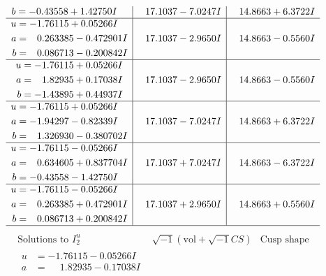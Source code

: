 \documentclass[1p]{elsarticle_modified}
\theoremstyle{definition}
\newcommand{\I}{\sqrt{-1}}
\begin{document}
$$\begin{array}{c|c|c}
\begin{aligned}
b &= -0.43558 + 1.42750 I\end{aligned}
 & \phantom{-}17.1037 - 7.0247 I & \phantom{-}14.8663 + 6.3722 I \\ \hline\begin{aligned}
u &= -1.76115 + 0.05266 I \\
a &= \phantom{-}0.263385 - 0.472901 I \\
b &= \phantom{-}0.086713 - 0.200842 I\end{aligned}
 & \phantom{-}17.1037 - 2.9650 I & \phantom{-}14.8663 - 0.5560 I \\ \hline\begin{aligned}
u &= -1.76115 + 0.05266 I \\
a &= \phantom{-}1.82935 + 0.17038 I \\
b &= -1.43895 + 0.44937 I\end{aligned}
 & \phantom{-}17.1037 - 2.9650 I & \phantom{-}14.8663 - 0.5560 I \\ \hline\begin{aligned}
u &= -1.76115 + 0.05266 I \\
a &= -1.94297 - 0.82339 I \\
b &= \phantom{-}1.326930 - 0.380702 I\end{aligned}
 & \phantom{-}17.1037 - 7.0247 I & \phantom{-}14.8663 + 6.3722 I \\ \hline\begin{aligned}
u &= -1.76115 - 0.05266 I \\
a &= \phantom{-}0.634605 + 0.837704 I \\
b &= -0.43558 - 1.42750 I\end{aligned}
 & \phantom{-}17.1037 + 7.0247 I & \phantom{-}14.8663 - 6.3722 I \\ \hline\begin{aligned}
u &= -1.76115 - 0.05266 I \\
a &= \phantom{-}0.263385 + 0.472901 I \\
b &= \phantom{-}0.086713 + 0.200842 I\end{aligned}
 & \phantom{-}17.1037 + 2.9650 I & \phantom{-}14.8663 + 0.5560 I\\
 \hline 
 \end{array}$$\newpage$$\begin{array}{c|c|c}  
\text{Solutions to }I^u_{2}& \I (\text{vol} + \sqrt{-1}CS) & \text{Cusp shape}\\
 \hline 
\begin{aligned}
u &= -1.76115 - 0.05266 I \\
a &= \phantom{-}1.82935 - 0.17038 I \\

\end{aligned}
\end{array}$$
\end{document}
